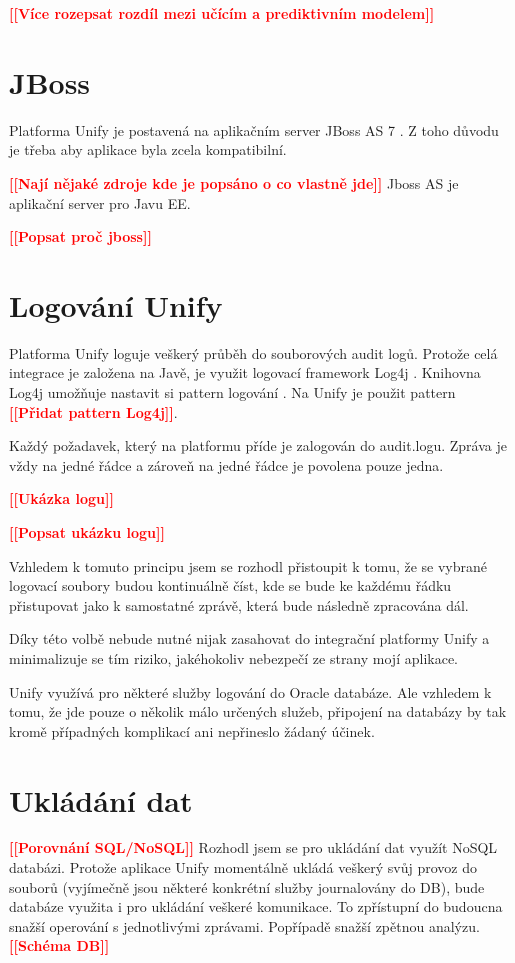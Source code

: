 \documentclass[thesis=M,czech]{FITthesis}[2012/10/20]
\newcommand{\todo}[1]{\textcolor{red}{\textbf{[[#1]]}}}
\newcommand{\blind}[1][1]{\textcolor{gray}{\Blindtext[#1][1]}}
\begin{document}
		\todo{Více rozepsat rozdíl mezi učícím a prediktivním modelem}
		
	\section{JBoss}
		\label{sec:jboss}
		Platforma Unify je postavená na aplikačním server JBoss AS 7 \cite{unify}. Z toho důvodu je třeba aby aplikace byla zcela kompatibilní.
		 
		 \todo{Nají nějaké zdroje kde je popsáno o co vlastně jde}
		Jboss AS je aplikační server pro Javu EE\cite{jboss}. 
			
		\todo{Popsat proč jboss}
		\blind[1]	
					
	\section{Logování Unify}
		\label{sec:logging_unify}
		Platforma Unify loguje veškerý průběh do souborových audit logů. Protože celá integrace je založena na Javě, je využit logovací framework Log4j \cite{log4j}. Knihovna Log4j umožňuje nastavit si pattern logování \cite{log4jPatternLayout}. Na Unify je použit pattern \todo{Přidat pattern Log4j}. 
		
		Každý požadavek, který na platformu příde je zalogován do audit.logu. Zpráva je vždy na jedné řádce a zároveň na jedné řádce je povolena pouze jedna.
		
		
		\todo{Ukázka logu}
		
		\todo{Popsat ukázku logu}
		
		Vzhledem k tomuto principu jsem se rozhodl přistoupit k tomu, že se vybrané logovací soubory budou kontinuálně číst, kde se bude ke každému řádku přistupovat jako k samostatné zprávě, která bude následně zpracována dál.
		
		Díky této volbě nebude nutné nijak zasahovat do integrační platformy Unify a minimalizuje se tím riziko, jakéhokoliv nebezpečí ze strany mojí aplikace.
		
		Unify využívá pro některé služby logování do Oracle databáze. Ale vzhledem k tomu, že jde pouze o několik málo určených služeb, připojení na databázy by tak kromě případných komplikací ani nepřineslo žádaný účinek.
		
		
	\section{Ukládání dat}
		\label{sec:data_storing}
		\todo{Porovnání SQL/NoSQL}
		Rozhodl jsem se pro ukládání dat využít NoSQL databázi. Protože aplikace Unify momentálně ukládá veškerý svůj provoz do souborů (vyjímečně jsou některé konkrétní služby journalovány do DB), bude databáze využita i pro ukládání veškeré komunikace. To zpřístupní do budoucna snažší operování s jednotlivými zprávami. Popřípadě snažší zpětnou analýzu.
		\todo{Schéma DB}
		
\end{document}
